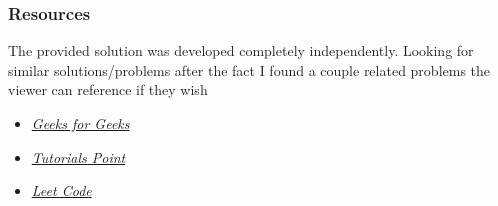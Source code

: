 \documentclass{beamer}
\newcommand{\XB}{\color{black}}
\newcommand{\XV}{\color{violet}}
\begin{document}
\begin{frame}

  \frametitle{Resources}

  The provided solution was developed completely independently. Looking for similar solutions/problems after the fact I found a couple related problems the viewer can reference if they wish

  \vspace{2.5mm}
  \begin{itemize}
      \item \XV\textit{\large{\href{https://www.geeksforgeeks.org/generate-a-matrix-having-each-element-equal-to-the-sum-of-specified-submatrices-of-a-given-matrix/?ref=rp}{Geeks for Geeks}}}\XB
      \item \XV\textit{\large{\href{https://www.tutorialspoint.com/find-the-largest-area-rectangular-sub-matrix-whose-sum-is-equal-to-k-in-cplusplus}{Tutorials Point}}}\XB
      \item \XV\textit{\large{\href{https://leetcode.com/problems/number-of-submatrices-that-sum-to-target/solutions/2298642/fully-explained-intuition-4-solutions-must-read-with-image/}{Leet Code}}}\XB
  \end{itemize}

\end{frame}
\end{document}
